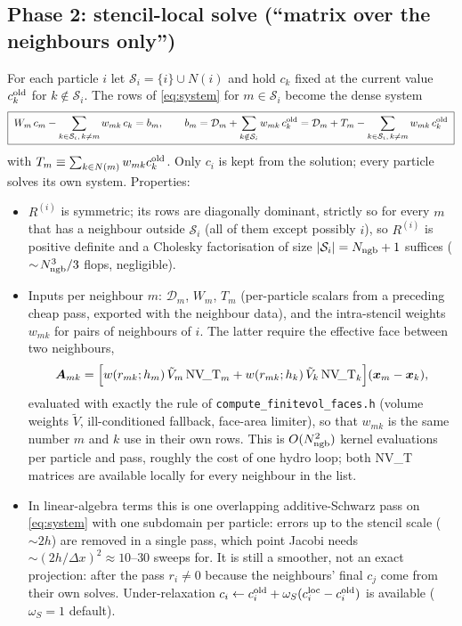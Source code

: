 \documentclass[11pt,a4paper]{article}
\newcommand{\cD}{\mathcal{D}}
\newcommand{\cS}{\mathcal{S}}
\newcommand{\bA}{\bm{A}}
\newcommand{\bx}{\bm{x}}
\newcommand{\code}[1]{\texttt{#1}}
\begin{document}
\subsection{Phase 2: stencil-local solve (``matrix over the neighbours only'')}
For each particle $i$ let $\cS_i=\{i\}\cup N(i)$ and hold $c_k$ fixed at the current value $c_k^{\rm old}$ for $k\notin\cS_i$. The rows of \eqref{eq:system} for $m\in\cS_i$ become the dense system
\begin{equation}
\boxed{\;W_m\,c_m-\sum_{k\in\cS_i,\,k\neq m}w_{mk}\,c_k=b_m,\qquad
b_m=\cD_m+\sum_{k\notin\cS_i}w_{mk}\,c^{\rm old}_k=\cD_m+T_m-\sum_{k\in\cS_i,\,k\neq m}w_{mk}\,c^{\rm old}_k\;}
\label{eq:local}
\end{equation}
with $T_m\equiv\sum_{k\in N(m)}w_{mk}c^{\rm old}_k$. Only $c_i$ is kept from the solution; every particle solves its own system. Properties:
\begin{itemize}
\item $R^{(i)}$ is symmetric; its rows are diagonally dominant, strictly so for every $m$ that has a neighbour outside $\cS_i$ (all of them except possibly $i$), so $R^{(i)}$ is positive definite and a Cholesky factorisation of size $|\cS_i|=N_{\rm ngb}+1$ suffices ($\sim\!N_{\rm ngb}^3/3$ flops, negligible).
\item Inputs per neighbour $m$: $\cD_m$, $W_m$, $T_m$ (per-particle scalars from a preceding cheap pass, exported with the neighbour data), and the intra-stencil weights $w_{mk}$ for pairs of neighbours of $i$. The latter require the effective face between two neighbours,
\begin{equation}
\bA_{mk}=\Big[w(r_{mk};h_m)\,\tilde V_m\,{\rm NV\!\_T}_m+w(r_{mk};h_k)\,\tilde V_k\,{\rm NV\!\_T}_k\Big](\bx_m-\bx_k),
\label{eq:facemk}
\end{equation}
evaluated with exactly the rule of \code{compute\_finitevol\_faces.h} (volume weights $\tilde V$, ill-conditioned fallback, face-area limiter), so that $w_{mk}$ is the same number $m$ and $k$ use in their own rows. This is $O(N_{\rm ngb}^2)$ kernel evaluations per particle and pass, roughly the cost of one hydro loop; both NV\_T matrices are available locally for every neighbour in the list.
\item In linear-algebra terms this is one overlapping additive-Schwarz pass on \eqref{eq:system} with one subdomain per particle: errors up to the stencil scale ($\sim2h$) are removed in a single pass, which point Jacobi needs $\sim(2h/\Delta x)^2\approx10$--$30$ sweeps for. It is still a smoother, not an exact projection: after the pass $r_i\ne0$ because the neighbours' final $c_j$ come from their own solves. Under-relaxation $c_i\leftarrow c_i^{\rm old}+\omega_S(c_i^{\rm loc}-c_i^{\rm old})$ is available ($\omega_S=1$ default).
\end{itemize}
\end{document}
